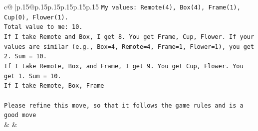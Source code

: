 \documentclass{article}
\begin{document}
{\begin{supertabular}{c@{$\;$}|p{.15\linewidth}@{}p{.15\linewidth}p{.15\linewidth}p{.15\linewidth}p{.15\linewidth}p{.15\linewidth}}
{{{\texttt{My values: Remote(4), Box(4), Frame(1), Cup(0), Flower(1).} \\
\texttt{Total value to me: 10.} \\
\texttt{If I take Remote and Box, I get 8. You get Frame, Cup, Flower. If your values are similar (e.g., Box=4, Remote=4, Frame=1, Flower=1), you get 2. Sum = 10.} \\
\texttt{If I take Remote, Box, and Frame, I get 9. You get Cup, Flower. You get 1. Sum = 10.} \\
\texttt{If I take Remote, Box, Frame } \\
\\ 
\texttt{Please refine this move, so that it follows the game rules and is a good move} \\
            }
        }
    }
    & & \\ \\


\end{supertabular}}
\end{document}
